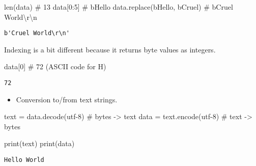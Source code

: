 \documentclass[
  letterpaper,
  DIV=11,
  numbers=noendperiod]{scrreprt}
\newenvironment{Shaded}{\begin{snugshade}}{\end{snugshade}}
\newcommand{\BuiltInTok}[1]{\textcolor[rgb]{0.00,0.46,0.62}{#1}}
\newcommand{\BuiltInTok}[1]{\textcolor[rgb]{0.00,0.48,0.65}{#1}}
\newcommand{\CommentTok}[1]{\textcolor[rgb]{0.37,0.37,0.37}{#1}}
\newcommand{\DecValTok}[1]{\textcolor[rgb]{0.68,0.00,0.00}{#1}}
\newcommand{\NormalTok}[1]{\textcolor[rgb]{0.00,0.46,0.62}{#1}}
\newcommand{\OperatorTok}[1]{\textcolor[rgb]{0.37,0.37,0.37}{#1}}
\newcommand{\NormalTok}[1]{\textcolor[rgb]{0.00,0.48,0.65}{#1}}
\newcommand{\OperatorTok}[1]{\textcolor[rgb]{0.37,0.37,0.37}{#1}}
\newcommand{\StringTok}[1]{\textcolor[rgb]{0.13,0.47,0.30}{#1}}
\providecommand{\tightlist}{%
  \setlength{\itemsep}{0pt}\setlength{\parskip}{0pt}}
\begin{document}
\begin{Shaded}
\begin{Highlighting}[]
\begin{Shaded}
\begin{Highlighting}[]
\BuiltInTok{len}\NormalTok{(data)                         }\CommentTok{\# 13}
\NormalTok{data[}\DecValTok{0}\NormalTok{:}\DecValTok{5}\NormalTok{]                         }\CommentTok{\# b\textquotesingle{}Hello\textquotesingle{}}
\NormalTok{data.replace(}\StringTok{b\textquotesingle{}Hello\textquotesingle{}}\NormalTok{, }\StringTok{b\textquotesingle{}Cruel\textquotesingle{}}\NormalTok{)  }\CommentTok{\# b\textquotesingle{}Cruel World\textbackslash{}r\textbackslash{}n\textquotesingle{}}
\end{Highlighting}
\end{Shaded}

\begin{verbatim}
b'Cruel World\r\n'
\end{verbatim}

Indexing is a bit different because it returns byte values as integers.

\begin{Shaded}
\begin{Highlighting}[]
\NormalTok{data[}\DecValTok{0}\NormalTok{]   }\CommentTok{\# 72 (ASCII code for \textquotesingle{}H\textquotesingle{})}
\end{Highlighting}
\end{Shaded}

\begin{verbatim}
72
\end{verbatim}

\begin{itemize}
\tightlist
\item
  Conversion to/from text strings.
\end{itemize}

\begin{Shaded}
\begin{Highlighting}[]
\NormalTok{text }\OperatorTok{=}\NormalTok{ data.decode(}\StringTok{\textquotesingle{}utf{-}8\textquotesingle{}}\NormalTok{) }\CommentTok{\# bytes {-}\textgreater{} text}
\NormalTok{data }\OperatorTok{=}\NormalTok{ text.encode(}\StringTok{\textquotesingle{}utf{-}8\textquotesingle{}}\NormalTok{) }\CommentTok{\# text {-}\textgreater{} bytes}

\BuiltInTok{print}\NormalTok{(text)}
\BuiltInTok{print}\NormalTok{(data)}
\end{Highlighting}
\end{Shaded}

\begin{verbatim}
Hello World


\end{verbatim}
\end{Highlighting}
\end{Shaded}
\end{document}
